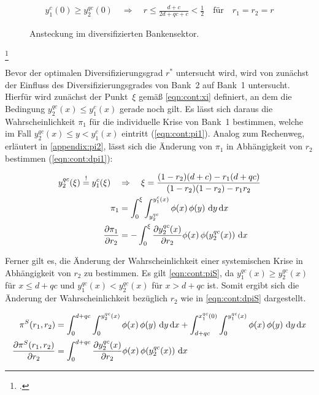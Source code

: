 \begin{align}
	y_1^c(0) \geq y_2^{qc}(0) \quad \Rightarrow \quad r \leq \frac{d+c}{2d+qc+c} < \frac{1}{2} \quad \text{für} \quad r_1 = r_2 = r \label{eqn:cont:impl}
\end{align}\vspace{-15mm}
\begin{figure}[t!]\centering
	\caption[Ansteckung im diversifizierten Bankensektor.]{Ansteckung im diversifizierten Bankensektor\footnotemark.}
	\label{fig:contagion}
\end{figure}
\footcitetext[nach][\pno~384(12), Fig.~3]{Wagner-2010}

Bevor der optimalen Diversifizierungsgrad $r^\ast$ untersucht wird, wird von \citeauthor{Wagner-2010} zunächst der Einfluss des Diversifizierungsgrades von Bank~2 auf Bank~1 untersucht. Hierfür wird zunächst der Punkt~$\xi$ gemäß \cref{eqn:cont:xi} definiert, an dem die Bedingung $y_2^{qc}(x) \leq y_1^c(x)$ gerade noch gilt. Es lässt sich daraus die Wahrscheinlichkeit $\pi_1$ für die individuelle Krise von Bank~1 bestimmen, welche im Fall $y_2^{qc}(x) \leq y < y_1^c(x)$ eintritt (\vgl \cref{eqn:cont:pi1}). Analog zum Rechenweg, erläutert in \cref{appendix:pi2}, lässt sich die Änderung von $\pi_1$ in Abhängigkeit von $r_2$ bestimmen (\vgl \cref{eqn:cont:dpi1}):

\begin{align}
	y_2^{qc}(\xi) \overset{!}{=} y_1^c(\xi) \quad & \Rightarrow \quad \xi = \frac{(1-r_2)(d+c)-r_1(d+qc)}{(1-r_2)(1-r_2)-r_1r_2} \label{eqn:cont:xi}   \\
	\pi_1                                         & = \int_0^{\xi} \int_{y_2^{qc}}^{y_1^c(x)} \phi(x)\,\phi(y)\ \dd y\, \dd x    \label{eqn:cont:pi1}  \\
	\pdv{\pi_1}{r_2}                              & = - \int_0^{\xi} \pdv{y_2^{qc}(x)}{r_2} \phi(x)\,\phi(y_2^{qc}(x))\ \dd x    \label{eqn:cont:dpi1}
\end{align}

Ferner gilt es, die Änderung der Wahrscheinlichkeit einer systemischen Krise in Abhängigkeit von $r_2$ zu bestimmen. Es gilt \cref{eqn:cont:piS}, da $y_1^{qc}(x) \geq y_2^{qc}(x)$ für $x \leq d+ qc$ und $y_1^{qc}(x) < y_2^{qc}(x)$ für $x > d+qc$ ist. Somit ergibt sich die Änderung der Wahrscheinlichkeit bezüglich $r_2$ wie in \cref{eqn:cont:dpiS} dargestellt.

\begin{align}
	\pi^{S}(r_1,r_2)            & = \int_0^{d+qc} \int_0^{y_2^{qc}(x)} \phi(x)\,\phi(y)\ \dd y\, \dd x + \int_{d+qc}^{x_1^{qc}(0)} \int_0^{y_1^{qc}(x)} \phi(x)\,\phi(y)\ \dd y\, \dd x 																		\label{eqn:cont:piS} \\
	\pdv{\pi^{S}(r_1,r_2)}{r_2} & = \int_0^{d+qc} \pdv{y_2^{qc}(x)}{r_2} \phi(x)\,\phi(y_2^{qc}(x))\ \dd x 	\label{eqn:cont:dpiS}
\end{align}

